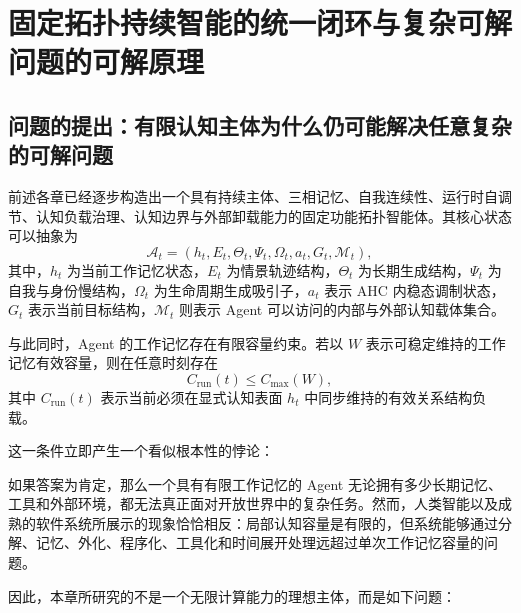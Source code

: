 \chapter{固定拓扑持续智能的统一闭环与复杂可解问题的可解原理}
\label{chap:fixed-topology-solvability}

\section{问题的提出：有限认知主体为什么仍可能解决任意复杂的可解问题}

前述各章已经逐步构造出一个具有持续主体、三相记忆、自我连续性、运行时自调节、认知负载治理、认知边界与外部卸载能力的固定功能拓扑智能体。其核心状态可以抽象为
\begin{equation}
\mathcal A_t
=
\left(
h_t,
E_t,
\Theta_t,
\Psi_t,
\Omega_t,
a_t,
G_t,
\mathcal M_t
\right),
\end{equation}
其中，$h_t$ 为当前工作记忆状态，$E_t$ 为情景轨迹结构，$\Theta_t$ 为长期生成结构，$\Psi_t$ 为自我与身份慢结构，$\Omega_t$ 为生命周期生成吸引子，$a_t$ 表示 AHC 内稳态调制状态，$G_t$ 表示当前目标结构，$\mathcal M_t$ 则表示 Agent 可以访问的内部与外部认知载体集合。

与此同时，Agent 的工作记忆存在有限容量约束。若以 $W$ 表示可稳定维持的工作记忆有效容量，则在任意时刻存在
\begin{equation}
C_{\mathrm{run}}(t)
\leq
C_{\max}(W),
\label{eq:wm-capacity}
\end{equation}
其中 $C_{\mathrm{run}}(t)$ 表示当前必须在显式认知表面 $h_t$ 中同步维持的有效关系结构负载。

这一条件立即产生一个看似根本性的悖论：

\begin{statementbox}
\centering
{}
\end{statementbox}

如果答案为肯定，那么一个具有有限工作记忆的 Agent 无论拥有多少长期记忆、工具和外部环境，都无法真正面对开放世界中的复杂任务。然而，人类智能以及成熟的软件系统所展示的现象恰恰相反：局部认知容量是有限的，但系统能够通过分解、记忆、外化、程序化、工具化和时间展开处理远超过单次工作记忆容量的问题。

因此，本章所研究的不是一个无限计算能力的理想主体，而是如下问题：

\begin{statementbox}
\centering
{}
\end{statementbox}

